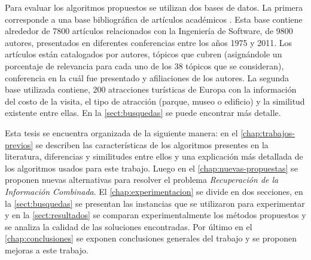 Para evaluar los algoritmos propuestos se utilizan dos bases de datos. La primera corresponde a una base bibliográfica de artículos académicos \cite{dataDrive}. Esta base contiene alrededor de 7800 artículos relacionados con la Ingeniería de Software, de 9800 autores, presentados en diferentes conferencias entre los años 1975 y 2011. Los artículos están catalogados por autores, tópicos que cubren (asignándole un porcentaje de relevancia para cada uno de los 38 tópicos que se consideran), conferencia en la cuál fue presentado y afiliaciones de los autores. La segunda base utilizada contiene, 200 atracciones turísticas de Europa con la información del costo de la visita, el tipo de atracción (parque, museo o edificio) y la similitud existente entre ellas. En la \autoref{sect:busquedas} se puede encontrar más detalle.

Esta tesis se encuentra organizada de la siguiente manera: en el \autoref{chap:trabajos-previos} se describen las características de los algoritmos presentes en la literatura, diferencias y similitudes entre ellos y una explicación más detallada de los algoritmos usados para este trabajo. Luego en el \autoref{chap:nuevas-propuestas} se proponen nuevas alternativas para resolver el problema {\em Recuperación de la Información Combinada}. El \autoref{chap:experimentacion} se divide en dos secciones, en la \autoref{sect:busquedas} se presentan las instancias que se utilizaron para experimentar y en la \autoref{sect:resultados} se 
comparan experimentalmente los métodos propuestos y se analiza la calidad de las soluciones encontradas. Por último en el \autoref{chap:conclusiones} se exponen conclusiones generales del trabajo y se proponen mejoras a este trabajo.
